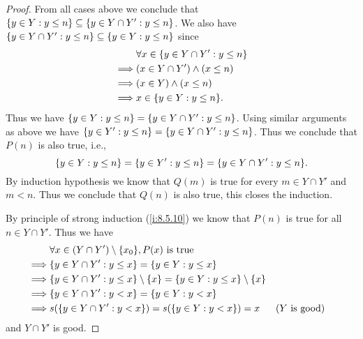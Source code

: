 \begin{proof}
  From all cases above we conclude that \(\left\lbrace y \in Y : y \leq n\right\rbrace \subseteq \left\lbrace y \in Y \cap Y' : y \leq n\right\rbrace\).
  We also have \(\left\lbrace y \in Y \cap Y' : y \leq n\right\rbrace \subseteq \left\lbrace y \in Y : y \leq n\right\rbrace\) since
  \begin{align*}
             & \forall x \in \set{y \in Y \cap Y' : y \leq n} \\
    \implies & (x \in Y \cap Y') \land (x \leq n)             \\
    \implies & (x \in Y) \land (x \leq n)                     \\
    \implies & x \in \set{y \in Y : y \leq n}.
  \end{align*}
  Thus we have \(\left\lbrace y \in Y : y \leq n\right\rbrace = \left\lbrace y \in Y \cap Y' : y \leq n\right\rbrace\).
  Using similar arguments as above we have \(\left\lbrace y \in Y' : y \leq n\right\rbrace = \left\lbrace y \in Y \cap Y' : y \leq n\right\rbrace\).
  Thus we conclude that \(P(n)\) is also true, i.e.,
  \[
    \set{y \in Y : y \leq n} = \set{y \in Y' : y \leq n} = \set{y \in Y \cap Y' : y \leq n}.
  \]
  By induction hypothesis we know that \(Q(m)\) is true for every \(m \in Y \cap Y'\) and \(m < n\).
  Thus we conclude that \(Q(n)\) is also true, this closes the induction.

  By principle of strong induction (\cref{i:8.5.10}) we know that \(P(n)\) is true for all \(n \in Y \cap Y'\).
  Thus we have
  \begin{align*}
             & \forall x \in (Y \cap Y') \setminus \set{x_0}, P(x) \text{ is true}                                                         \\
    \implies & \set{y \in Y \cap Y' : y \leq x} = \set{y \in Y : y \leq x}                                                                 \\
    \implies & \set{y \in Y \cap Y' : y \leq x} \setminus \set{x} = \set{y \in Y : y \leq x} \setminus \set{x}                             \\
    \implies & \set{y \in Y \cap Y' : y < x} = \set{y \in Y : y < x}                                                                       \\
    \implies & s(\set{y \in Y \cap Y' : y < x}) = s(\set{y \in Y : y < x}) = x                                 &  & \text{(\(Y\) is good)}
  \end{align*}
  and \(Y \cap Y'\) is good.


\end{proof}

